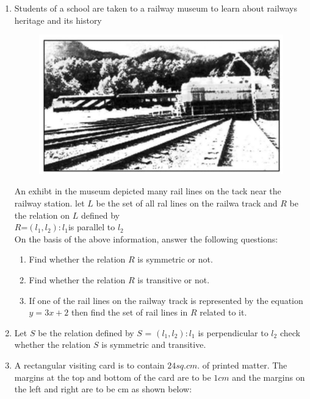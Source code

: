\documentclass{article}
\begin{document}
\begin{enumerate}
\item Students of a school are taken to a railway museum to learn about railways heritage and its history\\
	\begin{figure}[h!]
		\centering
		\includegraphics[width=columnwidth]{images/fig1.jpg}
		\label{fig:image1}
	\end{figure}
	An exhibt in the museum depicted many rail lines on the tack near the railway station. let $L$ be the set of all ral lines on the railwa track and $R$ be the relation on $L$ defined by\\
		$R$={$(l_{1},l_{2}):l_{1} $is parallel to $l_{2}$}\\
	On the basis of the above information, answer the following questions:
\begin{enumerate}
\item Find whether the relation $R$ is symmetric or not.

\item Find whether the relation $R$ is transitive or not.

\item If one of the rail lines on the railway track is represented by the equation $y = 3x + 2$ then find the set of rail lines in $R$ related to it.

\end{enumerate}
\item Let $S$ be the relation defined by $S$ = {$( l_{1},l_{2}):l_{1}$ is perpendicular to $l_{2}$} check whether the relation $S$ is symmetric and transitive.

\item A rectangular visiting card is to contain $24 sq.cm.$ of printed matter. The margins at the top and bottom of the card are to be $1 cm$ and the margins on the left and right are to be cm as shown below:


\end{enumerate}
\end{document}
